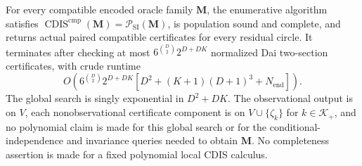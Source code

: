 For every compatible encoded oracle family \(\mathbf M\), the enumerative algorithm satisfies \(\operatorname{CDIS}^{\mathrm{cmp}}(\mathbf M)=\mathcal P_{\mathrm{SI}}(\mathbf M)\), is population sound and complete, and returns actual paired compatible certificates for every residual circle.  It terminates after checking at most \(6^{\binom D2}2^{D+DK}\) normalized Dai two-section certificates, with crude runtime
\[
O\!\left(6^{\binom D2}2^{D+DK}
\left[D^2+(K+1)(D+1)^3+N_{\mathrm{end}}\right]\right).
\]
The global search is singly exponential in \(D^2+DK\).  The observational output is on \(V\), each nonobservational certificate component is on \(V\cup\{\zeta_k\}\) for \(k\in\mathcal K_+\), and no polynomial claim is made for this global search or for the conditional-independence and invariance queries needed to obtain \(\mathbf M\).  No completeness assertion is made for a fixed polynomial local CDIS calculus.
